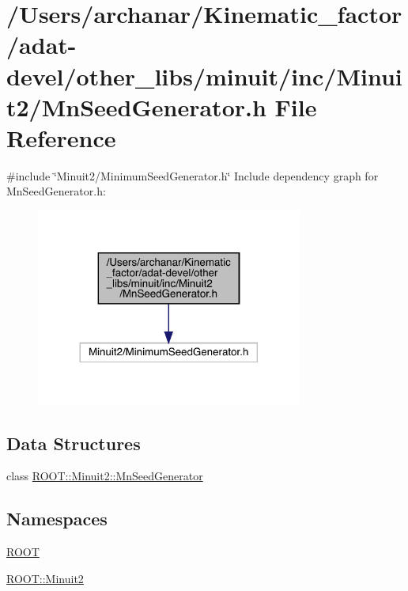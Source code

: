 \hypertarget{adat-devel_2other__libs_2minuit_2inc_2Minuit2_2MnSeedGenerator_8h}{}\section{/\+Users/archanar/\+Kinematic\+\_\+factor/adat-\/devel/other\+\_\+libs/minuit/inc/\+Minuit2/\+Mn\+Seed\+Generator.h File Reference}
\label{adat-devel_2other__libs_2minuit_2inc_2Minuit2_2MnSeedGenerator_8h}
{\ttfamily \#include \char`\"{}Minuit2/\+Minimum\+Seed\+Generator.\+h\char`\"{}}\newline
Include dependency graph for Mn\+Seed\+Generator.\+h\+:
\nopagebreak
\begin{figure}[H]
\begin{center}
\leavevmode
\includegraphics[width=248pt]{d4/d5c/adat-devel_2other__libs_2minuit_2inc_2Minuit2_2MnSeedGenerator_8h__incl}
\end{center}
\end{figure}
\subsection*{Data Structures}
\begin{DoxyCompactItemize}
\item 
class \mbox{\hyperlink{classROOT_1_1Minuit2_1_1MnSeedGenerator}{R\+O\+O\+T\+::\+Minuit2\+::\+Mn\+Seed\+Generator}}
\end{DoxyCompactItemize}
\subsection*{Namespaces}
\begin{DoxyCompactItemize}
\item 
 \mbox{\hyperlink{namespaceROOT}{R\+O\+OT}}
\item 
 \mbox{\hyperlink{namespaceROOT_1_1Minuit2}{R\+O\+O\+T\+::\+Minuit2}}
\end{DoxyCompactItemize}
